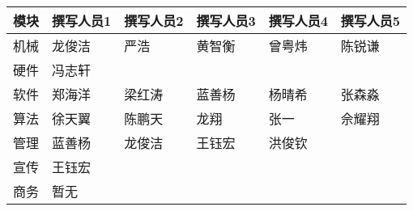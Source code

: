\begin{longtable}{ X | X | X | X | X | X }

    \hline

    \endfoot
    
    \rowcolor{tabhdcolor}
    
        模块 &
        撰写人员1 &
        撰写人员2 &
        撰写人员3 &
        撰写人员4 &
        撰写人员5 \\
    
    \hline
    
    \endhead
    
        机械 &
        龙俊洁 &
        严浩 &
        黄智衡 &
        曾粤炜 &
        陈锐谦 \\
    
    \hline
    
        硬件 &
        冯志轩 &
        &
        &
        &
        \\
    
    \hline
    
        软件 &
        郑海洋 &
        梁红涛 &
        蓝善杨 &
        杨晴希 &
        张森淼 \\
    
    \hline
        
        算法 &
        徐天翼 &
        陈鹏天 &
        龙翔 &
        张一 &
        佘耀翔\\
    
    \hline
    
        管理 &
        蓝善杨 &
        龙俊洁 &
        王钰宏 &
        洪俊钦 &
        \\
    
    \hline
    
        宣传 &
        王钰宏 &
         &
        &
        &
        \\
    
    \hline
    
        商务 &
        暂无 &
        &
        &
        &
        \\
    
    \hline
    
\end{longtable}